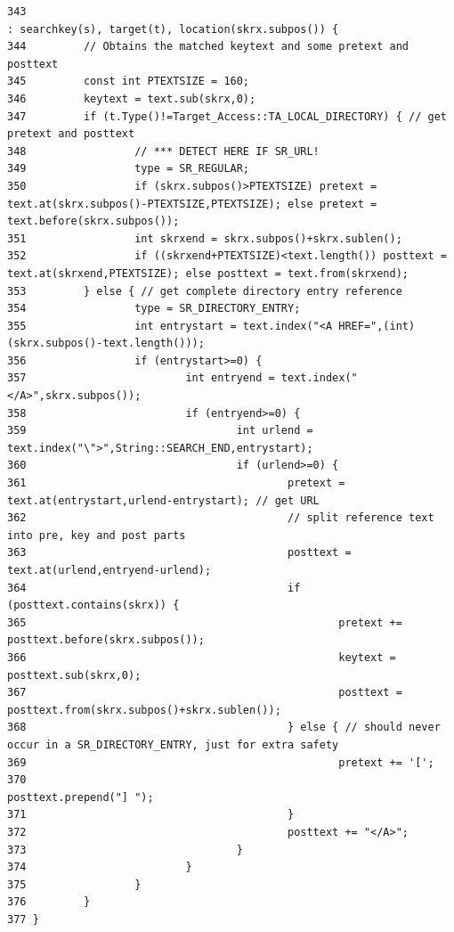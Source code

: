 \footnotesize\begin{verbatim}343                                                                                                          : searchkey(s), target(t), location(skrx.subpos()) {
344         // Obtains the matched keytext and some pretext and posttext
345         const int PTEXTSIZE = 160;
346         keytext = text.sub(skrx,0);
347         if (t.Type()!=Target_Access::TA_LOCAL_DIRECTORY) { // get pretext and posttext
348                 // *** DETECT HERE IF SR_URL!
349                 type = SR_REGULAR;
350                 if (skrx.subpos()>PTEXTSIZE) pretext = text.at(skrx.subpos()-PTEXTSIZE,PTEXTSIZE); else pretext = text.before(skrx.subpos());
351                 int skrxend = skrx.subpos()+skrx.sublen();
352                 if ((skrxend+PTEXTSIZE)<text.length()) posttext = text.at(skrxend,PTEXTSIZE); else posttext = text.from(skrxend);
353         } else { // get complete directory entry reference
354                 type = SR_DIRECTORY_ENTRY;
355                 int entrystart = text.index("<A HREF=",(int) (skrx.subpos()-text.length()));
356                 if (entrystart>=0) {
357                         int entryend = text.index("</A>",skrx.subpos());
358                         if (entryend>=0) {
359                                 int urlend = text.index("\">",String::SEARCH_END,entrystart);
360                                 if (urlend>=0) {
361                                         pretext = text.at(entrystart,urlend-entrystart); // get URL
362                                         // split reference text into pre, key and post parts
363                                         posttext = text.at(urlend,entryend-urlend);
364                                         if (posttext.contains(skrx)) {
365                                                 pretext += posttext.before(skrx.subpos());
366                                                 keytext = posttext.sub(skrx,0);
367                                                 posttext = posttext.from(skrx.subpos()+skrx.sublen());
368                                         } else { // should never occur in a SR_DIRECTORY_ENTRY, just for extra safety
369                                                 pretext += '[';
370                                                 posttext.prepend("] ");
371                                         }
372                                         posttext += "</A>";
373                                 }
374                         }
375                 }
376         }
377 }
\end{verbatim}\normalsize 



